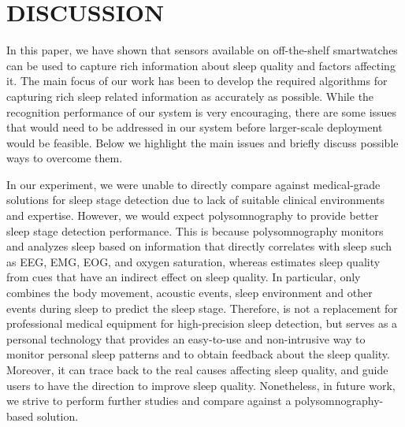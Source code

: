 \section{DISCUSSION}\label{sec:discussion}

In this paper, we have shown that sensors available on off-the-shelf smartwatches can be used to capture rich information about sleep quality and factors affecting it. The main focus of our work has been to develop the required algorithms for capturing rich sleep related information as accurately as possible. While the recognition performance of our system is very encouraging, there are some issues that would need to be addressed in our system before larger-scale deployment would be feasible. Below we highlight the main issues and briefly discuss possible ways to overcome them.


 {In our experiment, we were unable to directly compare {\systemname} against medical-grade solutions for sleep stage detection due to lack of suitable clinical environments and expertise.} However, we would expect polysomnography to provide better sleep stage detection performance. This is because polysomnography monitors and analyzes sleep based on information that directly correlates with sleep such as EEG, EMG, EOG, and oxygen saturation, whereas {\systemname} estimates sleep quality from cues that have an indirect effect on sleep quality. In particular, {\systemname} only combines the body movement, acoustic events, sleep environment and other events during sleep to predict the sleep stage. Therefore, {\systemname} is not a replacement for professional medical equipment for high-precision sleep detection, but serves as a personal technology that provides an easy-to-use and non-intrusive way to monitor personal sleep patterns and to obtain feedback about the sleep quality. Moreover, it can trace back to the real causes affecting sleep quality, and guide users to have the direction to improve sleep quality. Nonetheless, in future work, we strive to perform further studies and compare {\systemname} against a polysomnography-based solution.

